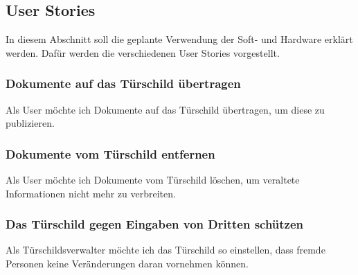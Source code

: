 \subsection{User Stories}
\label{sec:Usecases}
\begin{flushleft}
In diesem Abschnitt soll die geplante Verwendung der Soft- und Hardware erklärt werden.
Dafür werden die verschiedenen User Stories vorgestellt.



\subsubsection{Dokumente auf das Türschild übertragen} %
\label{ssub:Daten auf das Türschild übertragen}
Als User möchte ich Dokumente auf das Türschild übertragen, um diese zu publizieren. 

\subsubsection{Dokumente vom Türschild entfernen}
\label{ssub:Dokumente vom Speicher des Türschilds entfernen}
Als User möchte ich Dokumente vom Türschild löschen, um veraltete Informationen nicht mehr zu verbreiten.  

\subsubsection{Das Türschild gegen Eingaben von Dritten schützen}
\label{ssub:Das Türschild gegen Eingaben von Dritten schützen}
Als Türschildsverwalter möchte ich das Türschild so einstellen, dass fremde Personen keine Veränderungen daran vornehmen können. 
\newline
\end{flushleft}







